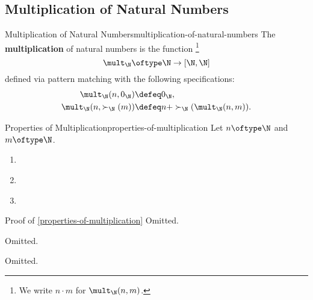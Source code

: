 \subsection{Multiplication of Natural Numbers}\label{subsection-martin-löf-type-theory-multiplication-of-natural-numbers}
\begin{definition}{Multiplication of Natural Numbers}{multiplication-of-natural-numbers}%
    The \textbf{multiplication} of natural numbers is the function%
    \footnote{%
        We write $n\cdot m$ for $\mult_{\N}(n,m)$.
        \par\vspace*{\TCBBoxCorrection}
    }%
    \[
        \mult_{\N}%
        \oftype%
        \N%
        \to%
        [\N,\N]%
    \]%
    defined via pattern matching with the following specifications:%
    \begin{align*}
        \mult_{\N}(n,0_{\N})        &\defeq 0_{\N},\\
        \mult_{\N}(n,\succ_{\N}(m)) &\defeq n+\succ_{\N}(\mult_{\N}(n,m)).%
    \end{align*}
\end{definition}
\begin{proposition}{Properties of Multiplication}{properties-of-multiplication}%
    Let $n\oftype\N$ and $m\oftype\N$.
    \begin{enumerate}
        \item\label{properties-of-multiplication-unitality}
        \item\label{properties-of-multiplication-associativity}
        \item\label{properties-of-multiplication-commutativity}
    \end{enumerate}
\end{proposition}
\begin{Proof}{Proof of \cref{properties-of-multiplication}}%
    Omitted.

    Omitted.

    Omitted.
\end{Proof}
